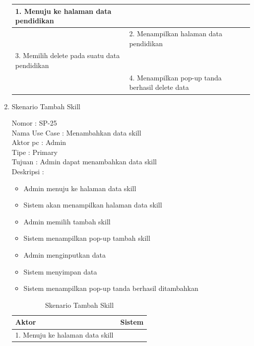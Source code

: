 \begin{enumerate}
\begin{table}
\begin{tabular}{ | p{55mm} | p{70mm}|}
		1.	Menuju ke halaman data pendidikan &  \\
		
		\hline
		
		&  2.	Menampilkan halaman data pendidikan \\
		
		\hline
		
		3. Memilih delete pada suatu data pendidikan & \\
		
		\hline
		
		& 4.	Menampilkan pop-up tanda berhasil delete data \\
		\hline
		
	\end{tabular}
\end{table}

\item Skenario Tambah Skill

Nomor \kern 3.6pc : SP-25 \\
Nama Use Case : Menambahkan data skill \\
Aktor  pc : Admin \\
Tipe \kern 4.6pc : Primary \\
Tujuan \kern 3.6pc : Admin dapat menambahkan data skill \\
Deskripsi \kern 2.5pc : 

\begin{itemize}
	\item Admin menuju ke halaman data skill
	\item Sistem akan menampilkan halaman data skill
	\item Admin memilih tambah skill
	\item Sistem menampilkan pop-up tambah skill
	\item Admin menginputkan data
	\item Sistem menyimpan data
	\item Sistem menampilkan pop-up tanda berhasil ditambahkan
	
\end{itemize}

\begin{table}
	\caption{Skenario Tambah Skill}
	\centering
	\begin{tabular}{ | l | p{65mm} |}
		\hline 
		\textbf{Aktor} & \textbf{Sistem} \\
		\hline
		
		1.	Menuju ke halaman data skill &  \\
		

\end{tabular}
\end{table}
\end{enumerate}
